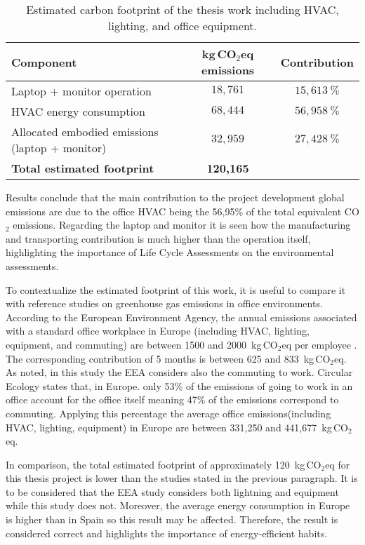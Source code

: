 \begin{table}[H]
\centering
\caption{Estimated carbon footprint of the thesis work including HVAC, lighting, and office equipment.}
\label{tab:contribution_CO2}
\renewcommand{\arraystretch}{1.15}
\small
\begin{tabular}{|l|c|c|}
\hline
\textbf{Component} & \textbf{kg\,CO$_2$eq emissions } & \textbf{Contribution} \\ 
\hline
Laptop + monitor operation & $18,761$ & $15,613~\%$ \\ 
HVAC energy consumption & $68,444$ & $56,958~\%$ \\ 
Allocated embodied emissions (laptop + monitor) & $32,959$ & $27,428~\%$ \\ 
\hline
\textbf{Total estimated footprint} & \textbf{120,165} &  \\ 
\hline
\end{tabular}
\end{table}

Results conclude that the main contribution to the project development global emissions are due to the office HVAC being the 56,95\% of 
the total equivalent CO$_2$ emissions. Regarding the laptop and monitor it is seen how the manufacturing and transporting contribution
is much higher than the operation itself, highlighting the importance of Life Cycle Assessments on the environmental assessments.

To contextualize the estimated footprint of this work, it is useful to compare it with reference studies on greenhouse gas emissions in office environments. 
According to the European Environment Agency, the annual emissions associated with a standard office workplace in 
Europe (including HVAC, lighting, equipment, and commuting) are between 1500 and 2000~kg\,CO$_2$eq per employee \cite{EEA2021OfficeEnergy}. The corresponding contribution
of 5 months is  between 625 and 833~kg\,CO$_2$eq. As noted, in this study the EEA considers also the commuting to work. Circular Ecology \cite{CircularEcology} states that, in Europe. only 53\%
of the emissions of going to work in an office account for the office itself meaning 47\% of the emissions correspond to commuting. Applying this percentage
the average office emissions(including HVAC, lighting, equipment) in Europe are between 331,250 and 441,677~kg\,CO$_2$eq.

In comparison, the total estimated footprint of approximately 120~kg\,CO$_2$eq for this thesis project is lower than the studies stated in the previous paragraph.
It is to be considered that the EEA study considers both lightning and equipment while this study does not. Moreover, the average energy consumption in Europe is
higher than in Spain so this result may be affected. Therefore, the result is considered correct and highlights the importance of energy-efficient habits.

